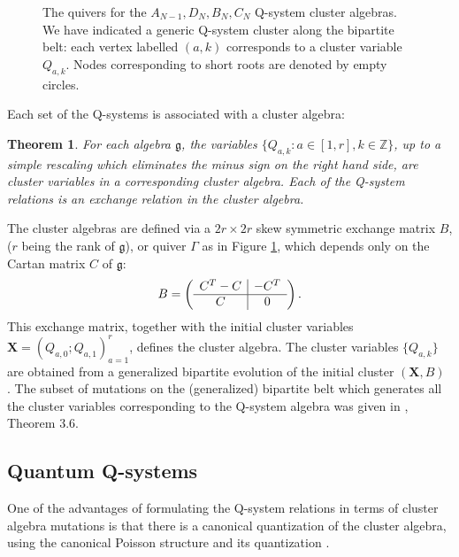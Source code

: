 \documentclass[12pt]{amsart}
\newtheorem{thm}{Theorem}[section]
\newcommand{\g}{{\mathfrak{g}}}
\newcommand{\bX}{{\mathbf X}}
\newcommand{\Z}{{\mathbb Z}}
\numberwithin{equation}{section}
\numberwithin{table}{section}
\begin{document}
\begin{figure}
\caption{\small The quivers for the $A_{N-1},D_N,B_N,C_N$ Q-system cluster algebras. 
We have indicated a generic Q-system cluster
along the bipartite belt: each vertex labelled $(a,k)$ corresponds to a cluster variable $Q_{a,k}$. Nodes corresponding to short roots are denoted by empty circles.}
\label{fig:CNquiv}
\end{figure}

Each set of the Q-systems is associated with a cluster algebra:
\begin{thm}\cite{Ke07,DFKQcluster}
For each algebra $\g$, the variables $\{Q_{a,k}: a\in[1,r], k\in \Z\}$, up to a simple rescaling which eliminates the minus sign on the right hand side, are cluster variables in a corresponding cluster algebra. Each of the Q-system relations is an exchange relation in the cluster algebra.
\end{thm}

The cluster algebras are defined via a $2r\times 2r$ skew symmetric exchange matrix $B$,
($r$ being the rank of $\g$), or quiver $\Gamma$ as in Figure \ref{fig:CNquiv}, which depends only on the Cartan matrix $C$ of $\g$:
\begin{equation}\label{Bmatrix}
B = \left(\begin{array}{c | c } C^T - C & -C^T \\ \hline C & 0\end{array}
\right). 
\end{equation}
This exchange matrix, together with the initial cluster variables $\bX = (Q_{a,0}; Q_{a,1})_{a=1}^r$, defines the cluster algebra. The cluster variables $\{Q_{a,k}\}$ are obtained from a generalized bipartite evolution of the initial cluster $(\bX,B)$ \cite{DFKQcluster}. 
The subset of mutations on the (generalized) bipartite belt which generates all the cluster variables corresponding to the Q-system algebra was given in \cite{DFKQcluster}, Theorem 3.6. 


\subsection{Quantum Q-systems}

One of the advantages of formulating the Q-system relations in terms of cluster algebra mutations is that there is a canonical quantization of the cluster algebra, using the canonical Poisson structure \cite{GSV} and its quantization \cite{BZ}. 
\end{document}

